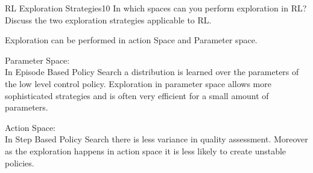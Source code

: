 
\begin{questions}
	

\begin{question}{RL Exploration Strategies}{10}
	In which spaces can you perform exploration in RL? Discuss the two  exploration strategies applicable to RL.
	
\begin{answer}
Exploration can be performed in action Space and Parameter space.

Parameter Space:\\
In Episode Based Policy Search a distribution is learned over the parameters of the low level control policy. Exploration in parameter space allows more sophisticated strategies and is often very efficient for a small amount of parameters. 

Action Space:\\
In Step Based Policy Search there is less variance in quality assessment. Moreover as the exploration happens in action space it is less likely to create unstable policies.
\end{answer}
\end{question}




\end{questions}